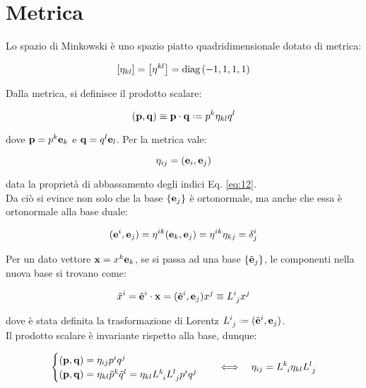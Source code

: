 
\section{Metrica}

Lo spazio di Minkowski è uno spazio piatto quadridimensionale dotato di metrica:

\begin{equation}
	\left[\eta_{kl}\right] = \left[\eta^{kl}\right] = \text{diag}\,(-1,1,1,1)
	\label{eq:2.1}
\end{equation}

Dalla metrica, si definisce il prodotto scalare:

\begin{equation}
	(\ve{p},\ve{q}) \equiv \ve{p}\cdot\ve{q} \defeq p^k \eta_{kl} q^l
	\label{eq:2.2}
\end{equation}

dove $ \mathbf{p} = p^k \mathbf{e}_k $ e $ \mathbf{q} = q^l \mathbf{e}_l $. Per la metrica vale:

\begin{equation}
	\eta_{ij} = (\mathbf{e}_i,\mathbf{e}_j)
	\label{eq:2.3}
\end{equation}

data la proprietà di abbassamento degli indici Eq. \ref{eq:12}.\\
Da ciò si evince non solo che la base $ \{\mathbf{e}_j\} $ è ortonormale, ma anche che essa è ortonormale alla base duale:

\begin{equation}
	(\mathbf{e}^i,\mathbf{e}_j) = \eta^{ik} (\mathbf{e}_k,\mathbf{e}_j) = \eta^{ik} \eta_{kj} = \delta^i_j
	\label{eq:2.4}
\end{equation}

Per un dato vettore $ \mathbf{x} = x^k \mathbf{e}_k $, se si passa ad una base $ \{\tilde{\mathbf{e}}_j\} $, le componenti nella nuova base si trovano come:

\begin{equation}
	\tilde{x}^i = \tilde{\mathbf{e}}^i \cdot \mathbf{x} = (\tilde{\mathbf{e}}^i,\mathbf{e}_j) x^j \equiv L^i_{\,\,j} x^j
	\label{eq:2.5}
\end{equation}

dove è stata definita la trasformazione di Lorentz $ L^i_{\,\,j} \defeq (\tilde{\ve{e}}^i,\ve{e}_j) $.\\
Il prodotto scalare è invariante rispetto alla base, dunque:

\begin{equation}
	\begin{cases}
		(\mathbf{p},\mathbf{q}) = \eta_{ij} p^i q^j  \\
		(\mathbf{p},\mathbf{q}) = \eta_{kl} \tilde{p}^k \tilde{q}^l = \eta_{kl} L^k_{\,\,\,i} L^l_{\,\,j} p^i q^j
	\end{cases}
	\quad \Longleftrightarrow \quad \eta_{ij} = L^k_{\,\,\,i} \eta_{kl} L^l_{\,\,j}
	\label{eq:2.6}
\end{equation}

